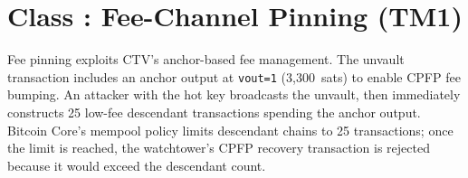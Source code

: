\section{Class \classfee{}: Fee-Channel Pinning (TM1)} \label{se:fee_pinning}

Fee pinning exploits CTV's anchor-based fee management. The unvault transaction
includes an anchor output at \texttt{vout=1} (3{,}300~sats) to enable CPFP fee
bumping. An attacker with the hot key broadcasts the unvault, then immediately
constructs 25 low-fee descendant transactions spending the anchor output. Bitcoin
Core's mempool policy limits descendant chains to 25 transactions; once the limit
is reached, the watchtower's CPFP recovery transaction is rejected because it would
exceed the descendant count.

